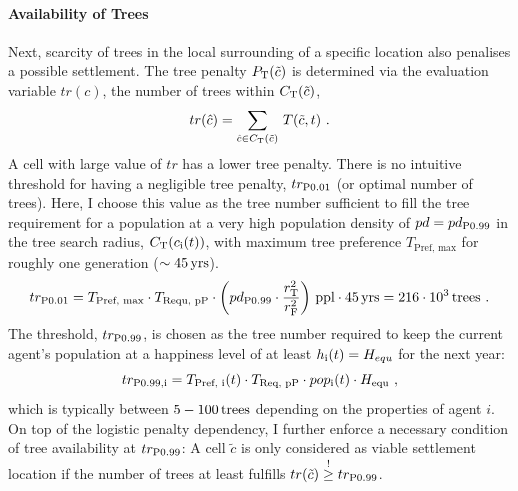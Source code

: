 \paragraph{Availability of Trees} %
Next, scarcity of trees in the local surrounding of a specific location also penalises a possible settlement.
The tree penalty $P_{\rm T}(\tilde{c})$ is determined via the evaluation variable $tr(c)$, the number of trees within $C_{\rm T}(\tilde{c})$,
\begin{equation}
	tr(\hat{c}) = \sum_{\hat{c} \in C_{\rm T}(\tilde{c})}\, T(\tilde{c},t) \ .
\end{equation}
A cell with large value of $tr$ has a lower tree penalty.
There is no intuitive threshold for having a negligible tree penalty, $tr_{\rm P0.01}$ (or optimal number of trees).
Here, I choose this value as the tree number sufficient to fill the tree requirement for a population at a very high population density of $pd = pd_{\rm P0.99}$ in the tree search radius, $C_{\rm T}(c_{\rm i}(t))$, with maximum tree preference $T_\text{Pref, max}$ for roughly one generation ($\sim 45\, {\rm yrs}$).
\begin{equation}
tr_{\rm P0.01} = T_\text{Pref, max} \cdot T_\text{Requ, pP} \cdot \left(pd_{\rm P0.99} \cdot \frac{r_{\rm T}^2}{r_{\rm F}^{2}}\right) \, {\rm ppl} \cdot 45\, {\rm yrs} = 
216\cdot 10^3 \, {\rm trees} \ .
\end{equation} 
The threshold, $tr_{\rm P0.99}$, is chosen as the tree number required to keep the current agent's population at a happiness level of at least $h_{\rm i}(t) = H_{equ}$ for the next year:
\begin{equation}%
tr_{\rm P0.99, i}= T_\text{Pref, i}(t) \cdot T_\text{Req, pP} \cdot pop_{\rm i}(t) \cdot H_\text{equ} \ ,
\end{equation}
which is typically between $5-100\, {\rm trees}$ depending on the properties of agent $i$.
On top of the logistic penalty dependency, I further enforce a necessary condition of tree availability at $tr_{\rm P0.99}$: 
A cell $\tilde{c}$ is only considered as viable settlement location if the number of trees at least fulfills $tr(\tilde{c}) \stackrel{!}{\geq} tr_{\rm P0.99}$. 
